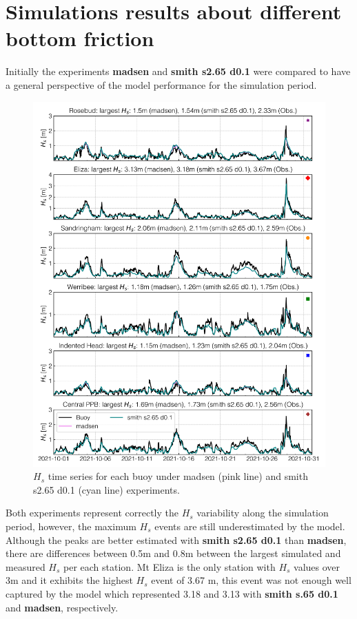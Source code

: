 \documentclass[12pt]{article}
\begin{document}
\newpage

\section{Simulations results about different bottom friction}

Initially the experiments \textbf{madsen} and \textbf{smith s2.65 d0.1} were compared to have a general perspective of the model performance for the simulation period. 

\begin{figure}[H]
    \centering
    \includegraphics[scale=0.7]{plots/hs_series/madsen_vs_smith s2.65 d0.1_vert.png}
    \caption{$H_{s}$ time series for each buoy under madsen (pink line) and smith s2.65 d0.1 (cyan line) experiments.}
    \label{fig:hs_madsen_vs_smith_def}
\end{figure}

Both experiments represent correctly the $H_s$ variability along the simulation period, however, the maximum $H_s$ events are still underestimated by the model. Although the peaks are better estimated with \textbf{smith s2.65 d0.1} than \textbf{madsen}, there are differences between 0.5m and 0.8m between the largest simulated and measured $H_s$ per each station. Mt Eliza is the only station with $H_s$ values over 3m and it exhibits the highest $H_s$ event of 3.67 m, this event was not enough well captured by the model which represented 3.18 and 3.13 with \textbf{smith s.65 d0.1} and \textbf{madsen}, respectively.
\end{document}
